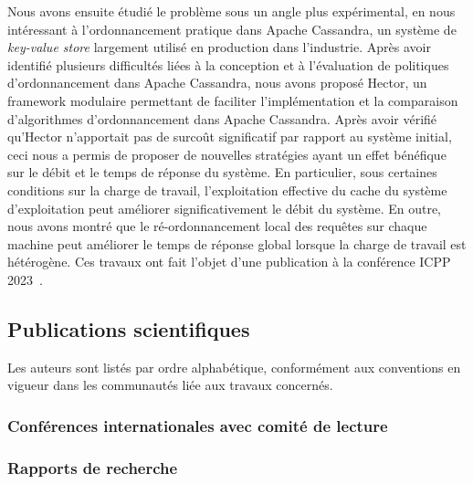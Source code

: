 \documentclass[12pt]{article}
\begin{document}
Nous avons ensuite étudié le problème sous un angle plus expérimental, en nous intéressant à
l'ordonnancement pratique dans Apache Cassandra, un système de \emph{key-value store} largement
utilisé en production dans l'industrie.  
Après avoir identifié plusieurs difficultés liées à la conception et à l'évaluation de politiques
d'ordonnancement dans Apache Cassandra, nous avons proposé Hector, un framework modulaire permettant
de faciliter l'implémentation et la comparaison d'algorithmes d'ordonnancement dans Apache
Cassandra.  
Après avoir vérifié qu'Hector n'apportait pas de surcoût significatif par rapport au système
initial, ceci nous a permis de proposer de nouvelles stratégies ayant un effet bénéfique sur le
débit et le temps de réponse du système.  
En particulier, sous certaines conditions sur la charge de travail, l'exploitation effective du
cache du système d'exploitation peut améliorer significativement le débit du système.  
En outre, nous avons montré que le ré-ordonnancement local des requêtes sur chaque machine peut
améliorer le temps de réponse global lorsque la charge de travail est hétérogène.  
Ces travaux ont fait l'objet d'une publication à la conférence ICPP 2023~\cite{canon2023b}.

\subsection{Publications scientifiques}

Les auteurs sont listés par ordre alphabétique, conformément aux conventions en vigueur dans les
communautés liée aux travaux concernés.

\newcommand{\showbib}[1]{%
    \begin{otherlanguage}{english}
        \printbibliography[heading=none,keyword={#1}]
    \end{otherlanguage}}

\subsubsection*{Conférences internationales avec comité de lecture}

\showbib{international proceedings}

\subsubsection*{Rapports de recherche}

\showbib{research report}

\end{document}
